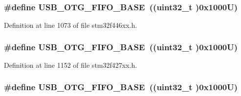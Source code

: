 \subsubsection[{\texorpdfstring{U\+S\+B\+\_\+\+O\+T\+G\+\_\+\+F\+I\+F\+O\+\_\+\+B\+A\+SE}{USB_OTG_FIFO_BASE}}]{\setlength{\rightskip}{0pt plus 5cm}\#define U\+S\+B\+\_\+\+O\+T\+G\+\_\+\+F\+I\+F\+O\+\_\+\+B\+A\+SE~((uint32\+\_\+t )0x1000\+U)}\hypertarget{group___peripheral__memory__map_gace340350802904868673f0e839c4fa04}{}\label{group___peripheral__memory__map_gace340350802904868673f0e839c4fa04}


Definition at line 1073 of file stm32f446xx.\+h.

\subsubsection[{\texorpdfstring{U\+S\+B\+\_\+\+O\+T\+G\+\_\+\+F\+I\+F\+O\+\_\+\+B\+A\+SE}{USB_OTG_FIFO_BASE}}]{\setlength{\rightskip}{0pt plus 5cm}\#define U\+S\+B\+\_\+\+O\+T\+G\+\_\+\+F\+I\+F\+O\+\_\+\+B\+A\+SE~((uint32\+\_\+t )0x1000\+U)}\hypertarget{group___peripheral__memory__map_gace340350802904868673f0e839c4fa04}{}\label{group___peripheral__memory__map_gace340350802904868673f0e839c4fa04}


Definition at line 1152 of file stm32f427xx.\+h.

\subsubsection[{\texorpdfstring{U\+S\+B\+\_\+\+O\+T\+G\+\_\+\+F\+I\+F\+O\+\_\+\+B\+A\+SE}{USB_OTG_FIFO_BASE}}]{\setlength{\rightskip}{0pt plus 5cm}\#define U\+S\+B\+\_\+\+O\+T\+G\+\_\+\+F\+I\+F\+O\+\_\+\+B\+A\+SE~((uint32\+\_\+t )0x1000\+U)}\hypertarget{group___peripheral__memory__map_gace340350802904868673f0e839c4fa04}{}\label{group___peripheral__memory__map_gace340350802904868673f0e839c4fa04}


